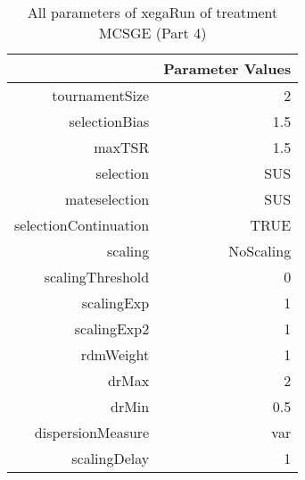 \begin{table}[ht]
\centering
\begin{tabular}{rr}
  \hline
 & Parameter Values \\ 
  \hline
tournamentSize & 2 \\ 
  selectionBias & 1.5 \\ 
  maxTSR & 1.5 \\ 
  selection & SUS \\ 
  mateselection & SUS \\ 
  selectionContinuation & TRUE \\ 
  scaling & NoScaling \\ 
  scalingThreshold & 0 \\ 
  scalingExp & 1 \\ 
  scalingExp2 & 1 \\ 
  rdmWeight & 1 \\ 
  drMax & 2 \\ 
  drMin & 0.5 \\ 
  dispersionMeasure & var \\ 
  scalingDelay & 1 \\ 
   \hline
\end{tabular}
\caption{ All parameters of xegaRun of treatment MCSGE 
 (Part 4)} 
\end{table}
